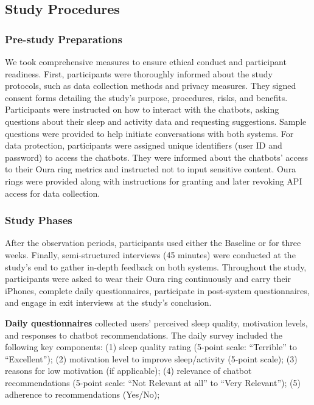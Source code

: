 \subsection{Study Procedures}

\subsubsection{Pre-study Preparations}
We took comprehensive measures to ensure ethical conduct and participant readiness.
First, participants were thoroughly informed about the study protocols, such as data collection methods and privacy measures. They signed consent forms detailing the study's purpose, procedures, risks, and benefits.
Participants were instructed on how to interact with the chatbots, asking questions about their sleep and activity data and requesting suggestions. Sample questions were provided to help initiate conversations with both systems.
For data protection, participants were assigned unique identifiers (user ID and password) to access the chatbots.
They were informed about the chatbots' access to their Oura ring metrics and instructed not to input sensitive content. 
Oura rings were provided along with instructions for granting and later revoking API access for data collection.


\subsubsection{Study Phases}
After the observation periods, participants used either the Baseline or \name{} for three weeks. 
Finally, semi-structured interviews (45 minutes) were conducted at the study's end to gather in-depth feedback on both systems.
Throughout the study, participants were asked to wear their Oura ring continuously and carry their iPhones, complete daily questionnaires, participate in post-system questionnaires, and engage in exit interviews at the study's conclusion.

\textbf{Daily questionnaires}
collected users' perceived sleep quality, motivation levels, and responses to chatbot recommendations.
The daily survey included the following key components:
(1) sleep quality rating (5-point scale: ``Terrible'' to ``Excellent''); 
(2) motivation level to improve sleep/activity (5-point scale);
(3) reasons for low motivation (if applicable);
(4) relevance of chatbot recommendations (5-point scale: ``Not Relevant at all'' to ``Very Relevant'');
(5) adherence to recommendations (Yes/No);


